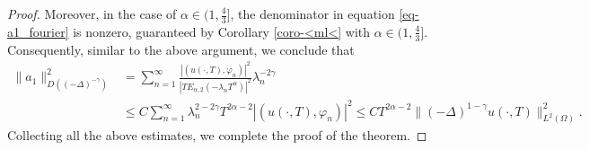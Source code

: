 \documentclass[11pt]{article}
\numberwithin{equation}{section}
\begin{document}
\begin{proof}
Moreover, in the case of $\alpha\in(1,\frac43]$, the denominator in equation \eqref{eq-a1_fourier} is nonzero, guaranteed by Corollary \ref{coro-<ml<} with $\alpha\in(1,\frac43]$. Consequently, similar to the above argument, we conclude that
\begin{align*}
\|a_1\|_{D((-\Delta)^{-\gamma})}^2
&=  \sum_{n=1}^{\infty} \frac{\left|(u(\cdot,T), \varphi_n)\right|^2} {\left|TE_{\alpha, 2}(-\lambda_n T^{\alpha})\right|^2} \lambda_n^{-2\gamma}
\\
& \leq C \sum_{n=1}^{\infty} \lambda_n^{2-2\gamma} T^{2\alpha-2} |(u(\cdot,T), \varphi_n)|^2
\leq C T^{2 \alpha - 2} \|(-\Delta)^{1-\gamma} u(\cdot,T)\|_{L^2(\Omega)}^2.
\end{align*}
Collecting all the above estimates, we complete the proof of the theorem.
\end{proof}
\end{document}
